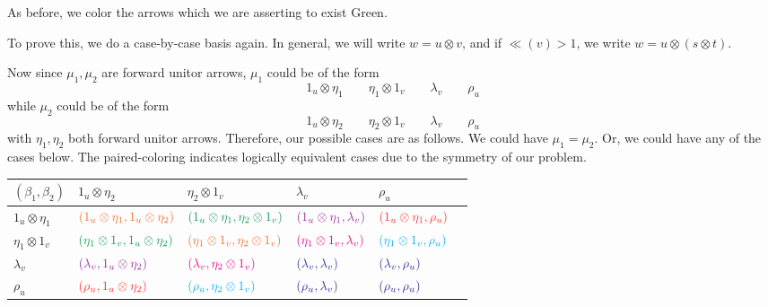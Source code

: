 As before, we color the arrows which we are asserting to exist Green.

\begin{prf}
To prove this, we do a case-by-case basis again. In general,  we will 
write $w = u\otimes v$, and if $\ll(v) > 1$, we write $w = u\otimes (s \otimes t)$. 

Now since $\mu_1, \mu_2$ are forward unitor arrows, $\mu_1$ could be of the form 
\[
    1_u \otimes \eta_1 \qquad \eta_1 \otimes 1_v \qquad \lambda_v \qquad \rho_u 
\]
while $\mu_2$ could be of the form 
\[
    1_u \otimes \eta_2 \qquad \eta_2 \otimes 1_v \qquad \lambda_v \qquad \rho_u 
\]
with $\eta_1, \eta_2$ both forward unitor arrows.
Therefore, our possible cases are as follows.
We could have $\mu_1 = \mu_2$. Or, we could have any of the cases below. 
The paired-coloring indicates logically equivalent cases
due to the symmetry of our problem. 
\begin{center}
    \begin{tabular}{ p{1.2cm} |p{3cm} p{3cm} p{3cm} p{2cm} p{2cm}  }
        $(\beta_1,\beta_2)$
        &
        $1_u\otimes \eta_2$
        &
        $\eta_2 \otimes 1_v$
        & 
        $\lambda_v$
        &
        $\rho_u$
        \\[0.2cm]
        \hline
        $1_u \otimes \eta_1$
        & $\textcolor{Orange}{(1_u \otimes \eta_1 ,1_u \otimes \eta_2)}$ 
        & $\textcolor{ForestGreen}{(1_u \otimes \eta_1, \eta_2\otimes 1_v)}$
        & 
        $\textcolor{Purple}{(1_u\otimes\eta_1 ,\lambda_v)}$ 
        &
        $\textcolor{red!80!White}{(1_u\otimes\eta_1 ,\rho_u)}$
        \\[0.2cm]
        $\eta_1\otimes 1_v$
        & $\textcolor{ForestGreen}{(\eta_1\otimes 1_v ,1_u \otimes \eta_2)}$ 
        & $\textcolor{Orange}{(\eta_1\otimes 1_v, \eta_2\otimes 1_v)}$
        & 
        $ \textcolor{Magenta}{(\eta_1\otimes 1_v, \lambda_v)}$ 
        &
        $\textcolor{ProcessBlue}{(\eta_1\otimes 1_v, \rho_u)}$
        \\[0.2cm]
        $\lambda_v$
        & $\textcolor{Purple}{(\lambda_v ,1_u \otimes \eta_2)}$ 
        & $\textcolor{Magenta}{(\lambda_v, \eta_2\otimes 1_v)}$
        & 
        $\textcolor{Blue}{(\lambda_v, \lambda_v)}$ 
        &
        $\textcolor{Blue}{(\lambda_v, \rho_u)}$
        \\[0.2cm]
        $\rho_u$
        & $\textcolor{red!80!White}{(\rho_u ,1_u \otimes \eta_2)}$ 
        & $\textcolor{ProcessBlue}{(\rho_u, \eta_2\otimes 1_v)}$
        & 
        $\textcolor{Blue}{(\rho_u, \lambda_v)}$ 
        &
        $\textcolor{Blue}{(\rho_u, \rho_u)}$
        \\[0.2cm]
    \end{tabular}
\end{center} 




\end{prf}
